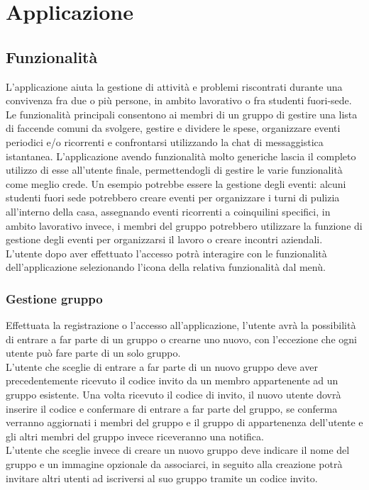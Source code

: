 \chapter{Applicazione}                %
\lhead[\fancyplain{}{\bfseries\thepage}]{\fancyplain{}{\bfseries\rightmark}}


\section{Funzionalità}                 %
L'applicazione aiuta la gestione di attività e problemi riscontrati durante una convivenza fra due o più persone, in ambito lavorativo o fra studenti fuori-sede.\\
Le funzionalità principali consentono ai membri di un gruppo di gestire una lista di faccende comuni da svolgere, gestire e dividere le spese, organizzare eventi periodici e/o ricorrenti e confrontarsi utilizzando la chat di messaggistica istantanea.
L'applicazione avendo funzionalità molto generiche lascia il completo utilizzo di esse all'utente finale, permettendogli di gestire le varie funzionalità come meglio crede. Un esempio potrebbe essere la gestione degli eventi: alcuni studenti fuori sede potrebbero creare eventi per organizzare i turni di pulizia all'interno della casa, assegnando eventi ricorrenti a coinquilini specifici, in ambito lavorativo invece, i membri del gruppo potrebbero utilizzare la funzione di gestione degli eventi per organizzarsi il lavoro o creare incontri aziendali.\\
L'utente dopo aver effettuato l'accesso potrà interagire con le funzionalità dell'applicazione selezionando l'icona della relativa funzionalità dal menù.


\subsection{Gestione gruppo}
Effettuata la registrazione o l'accesso all'applicazione, l'utente avrà la possibilità di entrare a far parte di un gruppo o crearne uno nuovo, con l'eccezione che ogni utente può fare parte di un solo gruppo.\\
L'utente che sceglie di entrare a far parte di un nuovo gruppo deve aver precedentemente ricevuto il codice invito da un membro appartenente ad un gruppo esistente. Una volta ricevuto il codice di invito, il nuovo utente dovrà inserire il codice e confermare di entrare a far parte del gruppo, se conferma verranno aggiornati i membri del gruppo e il gruppo di appartenenza dell'utente e gli altri membri del gruppo invece riceveranno una notifica.\\
L'utente che sceglie invece di creare un nuovo gruppo deve indicare il nome del gruppo e un immagine opzionale da associarci, in seguito alla creazione potrà invitare altri utenti ad iscriversi al suo gruppo tramite un codice invito.

